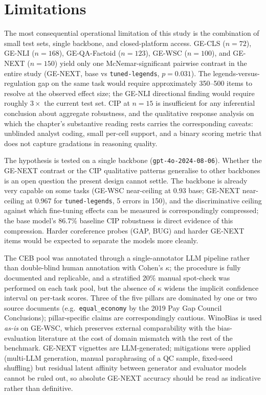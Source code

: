 \documentclass[pdflatex, sn-apa]{sn-jnl}%
\theoremstyle{thmstyleone}%
\theoremstyle{thmstyletwo}%
\theoremstyle{thmstylethree}%
\newcommand{\modellegends}{\texttt{tuned-legends}}
\begin{document}
\FloatBarrier

\section{Limitations}
\label{sec:limitations}

The most consequential operational limitation of this study is the
combination of small test sets, single backbone, and closed-platform
access. GE-CLS ($n=72$), GE-NLI ($n=168$), GE-QA-Factoid ($n=123$),
GE-WSC ($n=100$), and GE-NEXT ($n=150$) yield only one
McNemar-significant pairwise contrast in the entire study (GE-NEXT,
base vs \modellegends, $p=0.031$). The legends-versus-regulation gap
on the same task would require approximately 350--500 items to resolve
at the observed effect size; the GE-NLI directional finding would
require roughly $3\times$ the current test set. CIP at $n=15$ is
insufficient for any inferential conclusion about aggregate
robustness, and the qualitative response analysis on which the
chapter's substantive reading rests carries the corresponding
caveats: unblinded analyst coding, small per-cell support, and a
binary scoring metric that does not capture gradations in reasoning
quality.

The hypothesis is tested on a single backbone
(\texttt{gpt-4o-2024-08-06}). Whether the GE-NEXT contrast or the CIP
qualitative patterns generalise to other backbones is an open question
the present design cannot settle. The backbone is already very capable
on some tasks (GE-WSC near-ceiling at 0.93 base; GE-NEXT near-ceiling
at 0.967 for \modellegends, 5 errors in 150), and the discriminative
ceiling against which fine-tuning effects can be measured is
correspondingly compressed; the base model's 86.7\% baseline CIP
robustness is direct evidence of this compression. Harder coreference
probes (GAP, BUG) and harder GE-NEXT items would be expected to
separate the models more cleanly.

The CEB pool was annotated through a single-annotator LLM pipeline
rather than double-blind human annotation with Cohen's $\kappa$; the
procedure is fully documented and replicable, and a stratified 20\%
manual spot-check was performed on each task pool, but the absence of
$\kappa$ widens the implicit confidence interval on per-task scores.
Three of the five pillars are dominated by one or two source documents
(e.g.\ \texttt{equal\_economy} by the 2019 Pay Gap Council Conclusions);
pillar-specific claims are correspondingly cautious. WinoBias is used
\emph{as-is} on GE-WSC, which preserves external comparability with the
bias-evaluation literature at the cost of domain mismatch with the rest
of the benchmark. GE-NEXT vignettes are LLM-generated; mitigations were
applied (multi-LLM generation, manual paraphrasing of a QC sample,
fixed-seed shuffling) but residual latent affinity between generator
and evaluator models cannot be ruled out, so absolute GE-NEXT accuracy
should be read as indicative rather than definitive.
\end{document}
